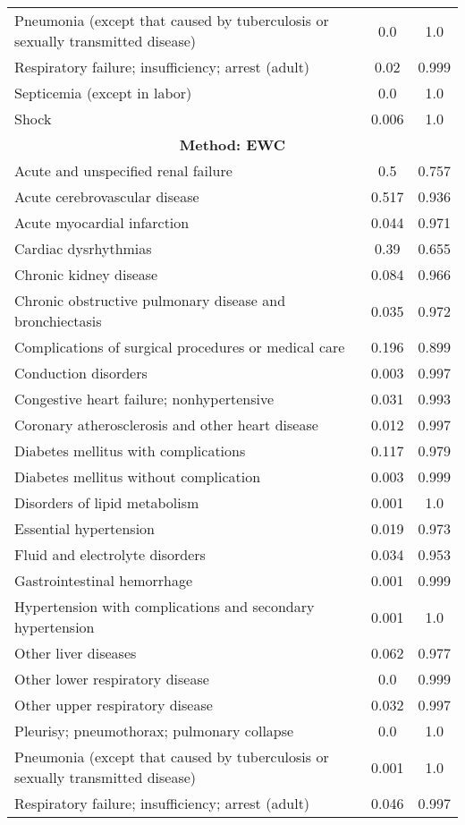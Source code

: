 \documentclass{article}
\begin{document}
\begin{longtable}{lcc}
Pneumonia (except that caused by tuberculosis or sexually transmitted disease) & 0.0 & 1.0 \\
Respiratory failure; insufficiency; arrest (adult) & 0.02 & 0.999 \\
Septicemia (except in labor) & 0.0 & 1.0 \\
Shock & 0.006 & 1.0 \\
\midrule
\multicolumn{3}{c}{\textbf{Method: EWC}} \\
\midrule
Acute and unspecified renal failure & 0.5 & 0.757 \\
Acute cerebrovascular disease & 0.517 & 0.936 \\
Acute myocardial infarction & 0.044 & 0.971 \\
Cardiac dysrhythmias & 0.39 & 0.655 \\
Chronic kidney disease & 0.084 & 0.966 \\
Chronic obstructive pulmonary disease and bronchiectasis & 0.035 & 0.972 \\
Complications of surgical procedures or medical care & 0.196 & 0.899 \\
Conduction disorders & 0.003 & 0.997 \\
Congestive heart failure; nonhypertensive & 0.031 & 0.993 \\
Coronary atherosclerosis and other heart disease & 0.012 & 0.997 \\
Diabetes mellitus with complications & 0.117 & 0.979 \\
Diabetes mellitus without complication & 0.003 & 0.999 \\
Disorders of lipid metabolism & 0.001 & 1.0 \\
Essential hypertension & 0.019 & 0.973 \\
Fluid and electrolyte disorders & 0.034 & 0.953 \\
Gastrointestinal hemorrhage & 0.001 & 0.999 \\
Hypertension with complications and secondary hypertension & 0.001 & 1.0 \\
Other liver diseases & 0.062 & 0.977 \\
Other lower respiratory disease & 0.0 & 0.999 \\
Other upper respiratory disease & 0.032 & 0.997 \\
Pleurisy; pneumothorax; pulmonary collapse & 0.0 & 1.0 \\
Pneumonia (except that caused by tuberculosis or sexually transmitted disease) & 0.001 & 1.0 \\
Respiratory failure; insufficiency; arrest (adult) & 0.046 & 0.997 \\

\end{longtable}
\end{document}
